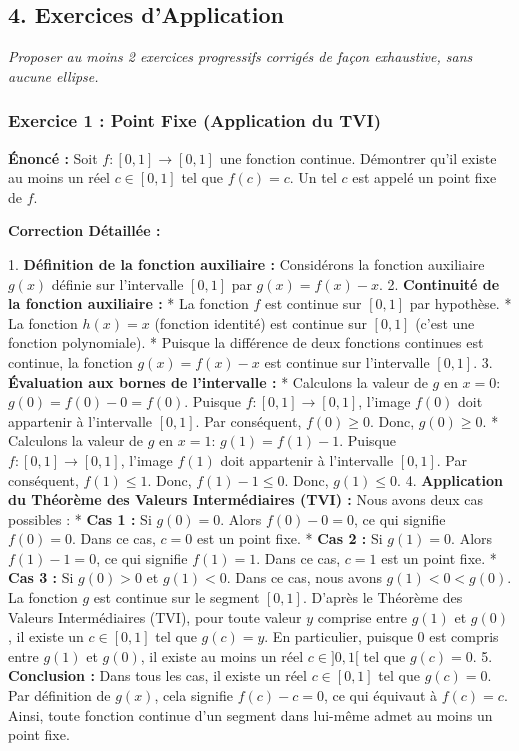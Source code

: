 \documentclass[12pt,a4paper]{report}
\begin{document}
\subsection{4. Exercices d'Application}
\textit{Proposer au moins 2 exercices progressifs corrigés de façon exhaustive, sans aucune ellipse.}

\subsubsection{Exercice 1 : Point Fixe (Application du TVI)}
\textbf{Énoncé :} Soit $f : [0, 1] \to [0, 1]$ une fonction continue. Démontrer qu'il existe au moins un réel $c \in [0, 1]$ tel que $f(c) = c$. Un tel $c$ est appelé un point fixe de $f$.

\textbf{Correction Détaillée :}

1.  \textbf{Définition de la fonction auxiliaire :}
    Considérons la fonction auxiliaire $g(x)$ définie sur l'intervalle $[0, 1]$ par $g(x) = f(x) - x$.
2.  \textbf{Continuité de la fonction auxiliaire :}
    *   La fonction $f$ est continue sur $[0, 1]$ par hypothèse.
    *   La fonction $h(x) = x$ (fonction identité) est continue sur $[0, 1]$ (c'est une fonction polynomiale).
    *   Puisque la différence de deux fonctions continues est continue, la fonction $g(x) = f(x) - x$ est continue sur l'intervalle $[0, 1]$.
3.  \textbf{Évaluation aux bornes de l'intervalle :}
    *   Calculons la valeur de $g$ en $x=0$:
        $g(0) = f(0) - 0 = f(0)$.
        Puisque $f : [0, 1] \to [0, 1]$, l'image $f(0)$ doit appartenir à l'intervalle $[0, 1]$.
        Par conséquent, $f(0) \ge 0$. Donc, $g(0) \ge 0$.
    *   Calculons la valeur de $g$ en $x=1$:
        $g(1) = f(1) - 1$.
        Puisque $f : [0, 1] \to [0, 1]$, l'image $f(1)$ doit appartenir à l'intervalle $[0, 1]$.
        Par conséquent, $f(1) \le 1$. Donc, $f(1) - 1 \le 0$. Donc, $g(1) \le 0$.
4.  \textbf{Application du Théorème des Valeurs Intermédiaires (TVI) :}
    Nous avons deux cas possibles :
    *   \textbf{Cas 1 :} Si $g(0) = 0$.
        Alors $f(0) - 0 = 0$, ce qui signifie $f(0) = 0$. Dans ce cas, $c=0$ est un point fixe.
    *   \textbf{Cas 2 :} Si $g(1) = 0$.
        Alors $f(1) - 1 = 0$, ce qui signifie $f(1) = 1$. Dans ce cas, $c=1$ est un point fixe.
    *   \textbf{Cas 3 :} Si $g(0) > 0$ et $g(1) < 0$.
        Dans ce cas, nous avons $g(1) < 0 < g(0)$.
        La fonction $g$ est continue sur le segment $[0, 1]$.
        D'après le Théorème des Valeurs Intermédiaires (TVI), pour toute valeur $y$ comprise entre $g(1)$ et $g(0)$, il existe un $c \in [0, 1]$ tel que $g(c) = y$.
        En particulier, puisque $0$ est compris entre $g(1)$ et $g(0)$, il existe au moins un réel $c \in ]0, 1[$ tel que $g(c) = 0$.
5.  \textbf{Conclusion :}
    Dans tous les cas, il existe un réel $c \in [0, 1]$ tel que $g(c) = 0$.
    Par définition de $g(x)$, cela signifie $f(c) - c = 0$, ce qui équivaut à $f(c) = c$.
    Ainsi, toute fonction continue d'un segment dans lui-même admet au moins un point fixe.
\end{document}
